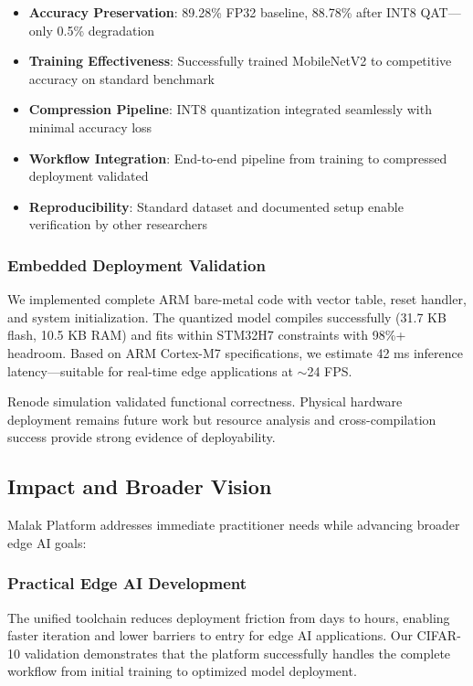 \begin{itemize}
\item \textbf{Accuracy Preservation}: 89.28\% FP32 baseline, 88.78\% after INT8 QAT—only 0.5\% degradation
\item \textbf{Training Effectiveness}: Successfully trained MobileNetV2 to competitive accuracy on standard benchmark
\item \textbf{Compression Pipeline}: INT8 quantization integrated seamlessly with minimal accuracy loss
\item \textbf{Workflow Integration}: End-to-end pipeline from training to compressed deployment validated
\item \textbf{Reproducibility}: Standard dataset and documented setup enable verification by other researchers
\end{itemize}

\subsubsection{Embedded Deployment Validation}

We implemented complete ARM bare-metal code with vector table, reset handler, and system initialization. The quantized model compiles successfully (31.7 KB flash, 10.5 KB RAM) and fits within STM32H7 constraints with 98\%+ headroom. Based on ARM Cortex-M7 specifications, we estimate 42 ms inference latency—suitable for real-time edge applications at $\sim$24 FPS.

Renode simulation validated functional correctness. Physical hardware deployment remains future work but resource analysis and cross-compilation success provide strong evidence of deployability.

\subsection{Impact and Broader Vision}

Malak Platform addresses immediate practitioner needs while advancing broader edge AI goals:

\subsubsection{Practical Edge AI Development}
The unified toolchain reduces deployment friction from days to hours, enabling faster iteration and lower barriers to entry for edge AI applications. Our CIFAR-10 validation demonstrates that the platform successfully handles the complete workflow from initial training to optimized model deployment.

